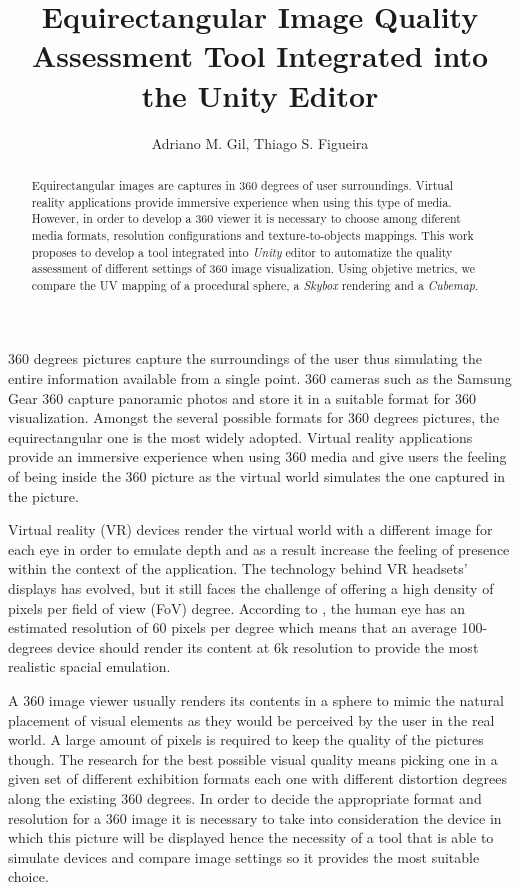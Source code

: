 \documentclass[12pt]{article}
\title{Equirectangular Image Quality Assessment Tool Integrated into the Unity Editor}
\author{Adriano M. Gil\inst{1}, Thiago S. Figueira\inst{1}}
\begin{document}
\maketitle

\begin{abstract}
    Equirectangular images are captures in 360 degrees of user surroundings. Virtual reality applications provide immersive experience when using this type of media. However, in order to develop a 360 viewer it is necessary to choose among diferent media formats, resolution configurations and texture-to-objects mappings. This work proposes to develop a tool integrated into \textit{Unity} editor to automatize the quality assessment of different settings of 360 image visualization. Using objetive metrics, we compare the UV mapping of a procedural sphere, a \textit{Skybox} rendering and a \textit{Cubemap}.
\end{abstract}

360 degrees pictures capture the surroundings of the user thus simulating the entire information available from a single point. 360 cameras such as the Samsung Gear 360 capture panoramic photos and store it in a suitable format for 360 visualization. Amongst the several possible formats for 360 degrees pictures, the equirectangular one is the most widely adopted. Virtual reality applications provide an immersive experience when using 360 media and give users the feeling of being inside the 360 picture as the virtual world simulates the one captured in the picture.

Virtual reality (VR) devices render the virtual world with a different image for each eye in order to emulate depth and as a result increase the feeling of presence within the context of the application. The technology behind VR headsets' displays has evolved, but it still faces the challenge of offering a high density of pixels per field of view (FoV) degree. According to \cite{va1965visual}, the human eye has an estimated resolution of 60 pixels per degree which means that an average 100-degrees device should render its content at 6k resolution to provide the most realistic spacial emulation.

A 360 image viewer usually renders its contents in a sphere to mimic the natural placement of visual elements as they would be perceived by the user in the real world. A large amount of pixels is required to keep the quality of the pictures though. The research for the best possible visual quality means picking one in a given set of different exhibition formats each one with different distortion degrees along the existing 360 degrees. In order to decide the appropriate format and resolution for a 360 image it is necessary to take into consideration the device in which this picture will be displayed hence the necessity of a tool that is able to simulate devices and compare image settings so it provides the most suitable choice.
\end{document}
